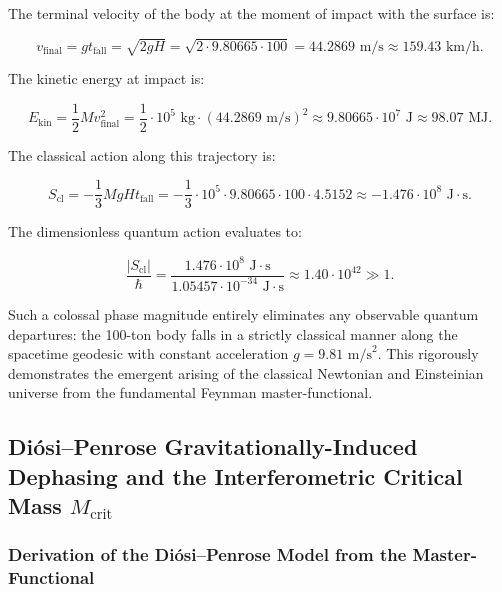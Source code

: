 The terminal velocity of the body at the moment of impact with the surface is:

\begin{equation}\label{eq:5.27}\tag{5.27}
v_{\text{final}} = g t_{\text{fall}} = \sqrt{2 g H} = \sqrt{2 \cdot 9.80665 \cdot 100} = 44.2869\text{ m/s} \approx 159.43\text{ km/h}.
\end{equation}

The kinetic energy at impact is:

\begin{equation}\label{eq:5.28}\tag{5.28}
E_{\text{kin}} = \frac{1}{2} M v_{\text{final}}^2 = \frac{1}{2} \cdot 10^5\text{ kg} \cdot (44.2869\text{ m/s})^2 \approx 9.80665 \cdot 10^7\text{ J} \approx 98.07\text{ MJ}.
\end{equation}

The classical action along this trajectory is:

\begin{equation}\label{eq:5.29}\tag{5.29}
S_{\text{cl}} = - \frac{1}{3} M g H t_{\text{fall}} = - \frac{1}{3} \cdot 10^5 \cdot 9.80665 \cdot 100 \cdot 4.5152 \approx - 1.476 \cdot 10^8\text{ J}\cdot\text{s}.
\end{equation}

The dimensionless quantum action evaluates to:

\begin{equation}\label{eq:5.30}\tag{5.30}
\frac{|S_{\text{cl}}|}{\hbar} = \frac{1.476 \cdot 10^8\text{ J}\cdot\text{s}}{1.05457 \cdot 10^{-34}\text{ J}\cdot\text{s}} \approx 1.40 \cdot 10^{42} \gg 1.
\end{equation}

Such a colossal phase magnitude entirely eliminates any observable quantum departures: the 100-ton body falls in a strictly classical manner along the spacetime geodesic with constant acceleration $g = 9.81\text{ m/s}^2$. This rigorously demonstrates the emergent arising of the classical Newtonian and Einsteinian universe from the fundamental Feynman master-functional.

\subsection{Diósi--Penrose Gravitationally-Induced Dephasing and the Interferometric Critical Mass $M_{\text{crit}}$}\label{sec:5.2}

\subsubsection{Derivation of the Diósi--Penrose Model from the Master-Functional}\label{sec:5.2.1}

